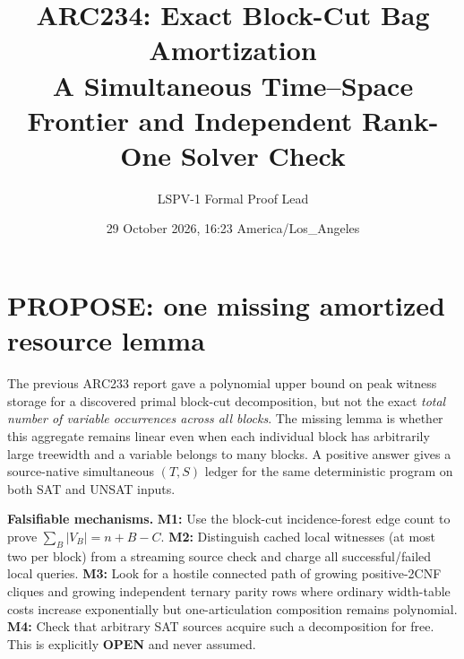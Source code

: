 \documentclass[10pt]{article}
\title{ARC234: Exact Block-Cut Bag Amortization\\\large A Simultaneous Time--Space Frontier and Independent Rank-One Solver Check}
\author{LSPV-1 Formal Proof Lead}
\date{29 October 2026, 16:23 America/Los\_Angeles}
\begin{document}
\maketitle
\noindent{}

\section{PROPOSE: one missing amortized resource lemma}
The previous ARC233 report gave a polynomial upper bound on peak witness storage for a discovered primal block-cut decomposition, but not the exact \emph{total number of variable occurrences across all blocks}. The missing lemma is whether this aggregate remains linear even when each individual block has arbitrarily large treewidth and a variable belongs to many blocks. A positive answer gives a source-native simultaneous $(T,S)$ ledger for the same deterministic program on both SAT and UNSAT inputs.

\noindent\textbf{Falsifiable mechanisms.} \textbf{M1:} Use the block-cut incidence-forest edge count to prove $\sum_B|V_B|=n+B-C$. \textbf{M2:} Distinguish cached local witnesses (at most two per block) from a streaming source check and charge all successful/failed local queries. \textbf{M3:} Look for a hostile connected path of growing positive-2CNF cliques and growing independent ternary parity rows where ordinary width-table costs increase exponentially but one-articulation composition remains polynomial. \textbf{M4:} Check that arbitrary SAT sources acquire such a decomposition for free. This is explicitly \textbf{OPEN} and never assumed.
\end{document}
